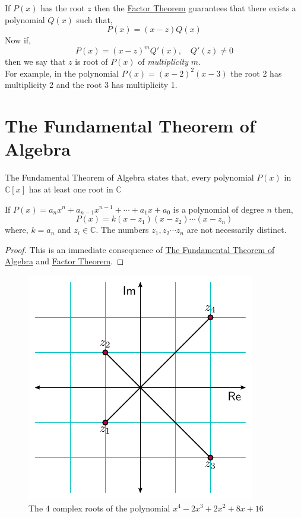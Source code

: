 If $P(x)$ has the root $z$ then the \hyperref[thm:factor-theorem]{Factor Theorem} guarantees that there exists a polynomial 
$Q(x)$ such that,
\[
    P(x) = \left(x - z\right)Q(x)
\]
Now if,
\[
    P(x) = \left(x-z\right)^{m}Q'(x), \quad Q'(z) \neq 0
\]
then we say that $z$ is root of $P(x)$ of \textit{multiplicity} $m$. \\
For example, in the polynomial $P(x)=\left(x-2\right)^{2}\left(x-3\right)$ 
the root 2 has multiplicity 2 and the root 3 has multiplicity 1.

\section{The Fundamental Theorem of Algebra}

\begin{theorem}\label{thm:fta}
    The Fundamental Theorem of Algebra states that, every polynomial $P(x)$ in $\mathbb{C}[x]$ has at least 
    one root in $\mathbb{C}$
\end{theorem}
\begin{corollary}
    If $P(x) = a_{n}x^{n} + a_{n-1}x^{n-1} + \cdots + a_{1}x + a_{0}$ is a polynomial of degree $n$ then,
    \[
        P(x) = k(x - z_{1})(x - z_{2})\cdots (x - z_{n})
    \]
    where, $k = a_{n}$ and $z_{i} \in \mathbb{C}$. The numbers $z_{1},z_{2}\cdots z_{n}$ are not necessarily 
    distinct.
\end{corollary}
\begin{proof}
    This is an immediate consequence of \hyperref[thm:fta]{The Fundamental Theorem of Algebra} 
    and \hyperref[thm:factor-theorem]{Factor Theorem}.
\end{proof}

\begin{figure}[!htpb]
\centering
\includegraphics[scale=1]{polynomials/figures/cplane_roots.pdf}
\caption{The 4 complex roots of the polynomial $x^{4} - 2 x^{3} + 2 x^{2} + 8 x + 16$ }
\label{fig:cplane_roots}
\end{figure}

